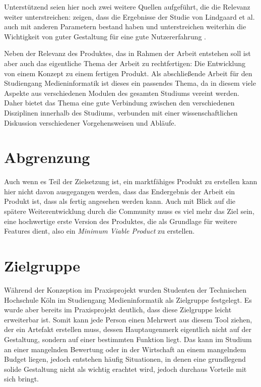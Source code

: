 Unterstützend seien hier noch zwei weitere Quellen aufgeführt, die die Relevanz weiter unterstreichen:
\cite{tractinsky2006evaluating} zeigen, dass die Ergebnisse der Studie von Lindgaard et al. auch mit anderen Parametern bestand haben und unterstreichen weiterhin die Wichtigkeit von guter Gestaltung für eine gute Nutzererfahrung \cite{tractinsky2000beautiful}.

Neben der Relevanz des Produktes, das in Rahmen der Arbeit entstehen soll ist aber auch das eigentliche Thema der Arbeit zu rechtfertigen: Die Entwicklung von einem Konzept zu einem fertigen Produkt.
Als abschließende Arbeit für den Studiengang Medieninformatik ist dieses ein passendes Thema, da in diesem viele Aspekte aus verschiedenen Modulen des gesamten Studiums vereint werden. Daher bietet das Thema eine gute Verbindung zwischen den verschiedenen Disziplinen innerhalb des Studiums, verbunden mit einer wissenschaftlichen Diskussion verschiedener Vorgehensweisen und Abläufe.

\section{Abgrenzung}
Auch wenn es Teil der Zielsetzung ist, ein marktfähiges Produkt zu erstellen kann hier nicht davon ausgegangen werden, dass das Endergebnis der Arbeit ein Produkt ist, dass als fertig angesehen werden kann. Auch mit Blick auf die spätere Weiterentwicklung durch die Community muss es viel mehr das Ziel sein, eine hochwertige erste Version des Produktes, die als Grundlage für weitere Features dient, also ein \textit{Minimum Viable Product} zu erstellen.

\section{Zielgruppe}
Während der Konzeption im Praxisprojekt wurden Studenten der Technischen Hochschule Köln im Studiengang Medieninformatik als Zielgruppe festgelegt. Es wurde aber bereits im Praxisprojekt deutlich, dass diese Zielgruppe leicht erweiterbar ist. Somit kann jede Person einen Mehrwert aus diesem Tool ziehen, der ein Artefakt erstellen muss, dessen Hauptaugenmerk eigentlich nicht auf der Gestaltung, sondern auf einer bestimmten Funktion liegt. Das kann im Studium an einer mangelnden Bewertung oder in der Wirtschaft an einem mangelndem Budget liegen, jedoch entstehen häufig Situationen, in denen eine grundlegend solide Gestaltung nicht als wichtig erachtet wird, jedoch durchaus Vorteile mit sich bringt.

